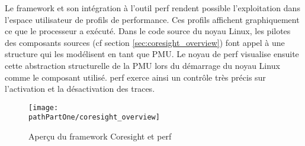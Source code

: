 Le framework et son intégration à l'outil perf rendent possible l'exploitation
dans l'espace utilisateur de profils de performance. Ces profils affichent
graphiquement ce que le processeur a exécuté. Dans le code source du noyau
Linux, les pilotes des composants sources (cf section
\ref{sec:coresight_overview}) font appel à une structure qui les modélisent en
tant que PMU. Le noyau de perf visualise ensuite cette abstraction
structurelle de la PMU lors du démarrage du noyau Linux comme le composant
utilisé. perf exerce ainsi un contrôle très précis sur l'activation et la
désactivation des traces. \\ 

\begin{figure}[H]
	\begin{center}
		\texttt{[image: \\pathPartOne/coresight\_overview]}
		\caption{Aperçu du framework Coresight et perf}
	    \label{fig:coresight_overview}
	\end{center}
\end{figure}

%
%
